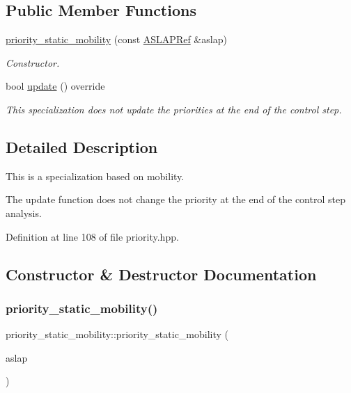 \subsection*{Public Member Functions}
\begin{DoxyCompactItemize}
\item 
\hyperlink{structpriority__static__mobility_a206b24a8a6340ee6b4ab25618a40a8b0}{priority\+\_\+static\+\_\+mobility} (const \hyperlink{ASLAP_8hpp_afa0405547acd1806b9bd3e5d03beb045}{A\+S\+L\+A\+P\+Ref} \&aslap)
\begin{DoxyCompactList}\small\item\em Constructor. \end{DoxyCompactList}\item 
bool \hyperlink{structpriority__static__mobility_a2657d8916b4c48c72e158fc399eb298a}{update} () override
\begin{DoxyCompactList}\small\item\em This specialization does not update the priorities at the end of the control step. \end{DoxyCompactList}\end{DoxyCompactItemize}


\subsection{Detailed Description}
This is a specialization based on mobility. 

The update function does not change the priority at the end of the control step analysis. 

Definition at line 108 of file priority.\+hpp.



\subsection{Constructor \& Destructor Documentation}
\mbox{\label{structpriority__static__mobility_a206b24a8a6340ee6b4ab25618a40a8b0}} 
\subsubsection{\texorpdfstring{priority\+\_\+static\+\_\+mobility()}{priority\_static\_mobility()}}
{\footnotesize\ttfamily priority\+\_\+static\+\_\+mobility\+::priority\+\_\+static\+\_\+mobility (\begin{DoxyParamCaption}\item[{const \hyperlink{ASLAP_8hpp_afa0405547acd1806b9bd3e5d03beb045}{A\+S\+L\+A\+P\+Ref} \&}]{aslap }\end{DoxyParamCaption})\hspace{0.3cm}{\ttfamily [explicit]}}



